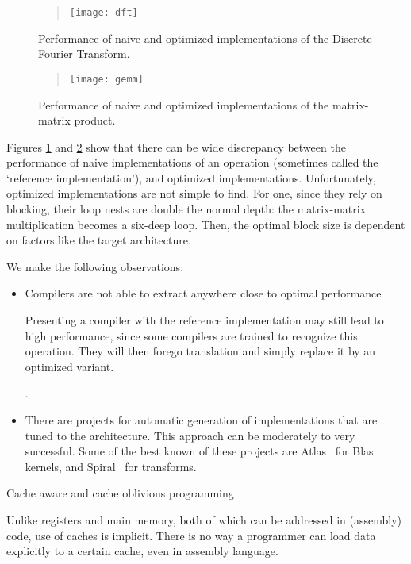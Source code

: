 \begin{figure}[ht]
  \begin{quote}
  \texttt{[image: dft]}
  \end{quote}
  \caption{Performance of naive and optimized implementations of the Discrete Fourier Transform.}
  \label{fig:dft-perf}
\end{figure}

\begin{figure}[ht]
  \begin{quote}
  \texttt{[image: gemm]}
  \end{quote}
  \caption{Performance of naive and optimized implementations of the matrix-matrix product.}
  \label{fig:gemm-perf}
\end{figure}

Figures \ref{fig:dft-perf} and \ref{fig:gemm-perf} show that there can
be wide discrepancy between the performance of naive implementations
of an operation (sometimes called the `reference implementation'), and
optimized implementations. Unfortunately, optimized implementations
are not simple to find. For one, since they rely on blocking, their
loop nests are double the normal depth: the matrix-matrix
multiplication becomes a six-deep loop. Then, the optimal block size
is dependent on factors like the target architecture.

We make the following observations:
\begin{itemize}
\item Compilers are not able to extract anywhere close
  to optimal performance
  \begin{footnoteenv}
    {Presenting a compiler with the
    reference implementation may still lead to high performance, since
    some compilers are trained to recognize this operation. They will
    then forego translation and simply replace it by an optimized
    variant.}
  \end{footnoteenv}
  .
\item There are  projects for automatic
  generation of implementations that are tuned to the
  architecture. This approach can be moderately to very
  successful. Some of the best known of these projects are
  Atlas~\cite{atlas-parcomp} for Blas kernels, and
  Spiral~\cite{spiral} for transforms.
\end{itemize}

 {Cache aware and cache oblivious programming}
\label{sec:cache-oblivious}

Unlike registers and main memory, both of
which can be addressed in (assembly) code, use of caches is
implicit. There is no way a programmer can load data explicitly to a
certain cache, even in assembly language. 

